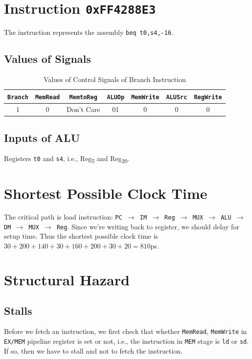 \documentclass[12pt, a4paper]{article}
\begin{document}
\section{Instruction \texttt{0xFF4288E3}}

The instruction represents the assembly \texttt{beq t0,s4,-16}.

\subsection{Values of Signals}

\begin{table}[hbp]
\caption{Values of Control Signals of Branch Instruction}
\label{tab:ctrl}
\centering
\begin{tabular}{ccccccc}
\texttt{Branch} & \texttt{MemRead} & \texttt{MemtoReg} & \texttt{ALUOp} & \texttt{MemWrite} & \texttt{ALUSrc} & \texttt{RegWrite} \\
\hline
1 & 0 & Don't Care & 01 & 0 & 0 & 0
\end{tabular}
\end{table}

\subsection{Inputs of ALU}

Registers \texttt{t0} and \texttt{s4}, i.e., Reg\textsubscript{5} and Reg\textsubscript{20}.

\section{Shortest Possible Clock Time}

The critical path is load instruction: \texttt{PC $\rightarrow$ IM $\rightarrow$ Reg $\rightarrow$ MUX $\rightarrow$ ALU $\rightarrow$ DM $\rightarrow$ MUX $\rightarrow$ Reg}. Since we're writing back to register, we should delay for setup time. Thus the shortest possible clock time is $30+200+140+30+160+200+30+20=810$ps.

\section{Structural Hazard}

\subsection{Stalls}

Before we fetch an instruction, we first check that whether \texttt{MemRead}, \texttt{MemWrite} in \texttt{EX/MEM} pipeline register is set or not, i.e., the instruction in \texttt{MEM} stage is \texttt{ld} or \texttt{sd}. If so, then we have to stall and not to fetch the instruction.
\end{document}
